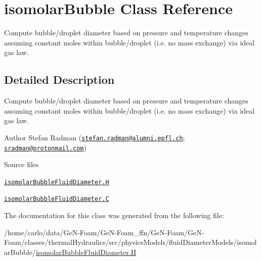 \hypertarget{classFoam_1_1isomolarBubble}{}\section{isomolar\+Bubble Class Reference}
\label{classFoam_1_1isomolarBubble}


Compute bubble/droplet diameter based on pressure and temperature changes assuming constant moles within bubble/droplet (i.\+e. no mass exchange) via ideal gas law.  




\subsection{Detailed Description}
Compute bubble/droplet diameter based on pressure and temperature changes assuming constant moles within bubble/droplet (i.\+e. no mass exchange) via ideal gas law. 

\label{_Description}%
 Author Stefan Radman (\href{mailto:stefan.radman@alumni.epfl.ch}{\tt stefan.\+radman@alumni.\+epfl.\+ch}; \href{mailto:sradman@protonmail.com}{\tt sradman@protonmail.\+com})

\begin{DoxyParagraph}{Source files}

\begin{DoxyItemize}
\item \href{../../../home/carlo/data/GeN-Foam/GeN-Foam_ffn/GeN-Foam/GeN-Foam/classes/thermalHydraulics/src/physicsModels/fluidDiameterModels/isomolarBubble/isomolarBubbleFluidDiameter.H}{\tt isomolar\+Bubble\+Fluid\+Diameter.\+H} 
\item \href{../../../home/carlo/data/GeN-Foam/GeN-Foam_ffn/GeN-Foam/GeN-Foam/classes/thermalHydraulics/src/physicsModels/fluidDiameterModels/isomolarBubble/isomolarBubbleFluidDiameter.C}{\tt isomolar\+Bubble\+Fluid\+Diameter.\+C} 
\end{DoxyItemize}
\end{DoxyParagraph}


The documentation for this class was generated from the following file\+:\begin{DoxyCompactItemize}
\item 
/home/carlo/data/\+Ge\+N-\/\+Foam/\+Ge\+N-\/\+Foam\+\_\+ffn/\+Ge\+N-\/\+Foam/\+Ge\+N-\/\+Foam/classes/thermal\+Hydraulics/src/physics\+Models/fluid\+Diameter\+Models/isomolar\+Bubble/\hyperlink{isomolarBubbleFluidDiameter_8H}{isomolar\+Bubble\+Fluid\+Diameter.\+H}\end{DoxyCompactItemize}
